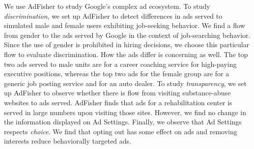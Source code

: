 \documentclass[10pt, onecolumn]{report}
\begin{document}
We use AdFisher to study Google's complex ad ecosystem. 
To study \emph{discrimination}, we set up AdFisher to detect differences 
in ads served to simulated male and female users exhibiting job-seeking behavior. 
We find a flow from gender to the ads served by Google in the context of 
job-searching behavior. Since 
the use of gender is prohibited in hiring decisions, we choose this particular flow to 
evaluate discrimination. How the ads differ is 
concerning as well. The top two ads served to male units are for a 
career coaching service for high-paying executive positions, 
whereas the top two ads for the female group are for a generic job posting 
service and for an auto dealer. 
To study \emph{transparency}, 
we set up AdFisher to observe whether there is flow from visiting 
substance-abuse websites to ads served. AdFisher finds that ads 
for a rehabilitation center is served in large numbers upon visiting those sites. 
However, we find no change in the information displayed on Ad Settings.
Finally, we observe that Ad Settings respects  
\emph{choice}. %
We find that opting out has some effect on ads and removing interests 
reduce behaviorally targeted ads\cite{datta2015automated}.
\end{document}

